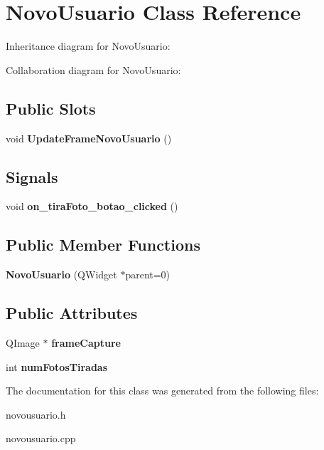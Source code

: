 \hypertarget{classNovoUsuario}{}\section{Novo\+Usuario Class Reference}
\label{classNovoUsuario}


Inheritance diagram for Novo\+Usuario\+:


Collaboration diagram for Novo\+Usuario\+:
\subsection*{Public Slots}
\begin{DoxyCompactItemize}
\item 
void {\bfseries Update\+Frame\+Novo\+Usuario} ()\hypertarget{classNovoUsuario_a023fce202af8022f8fd4a524b86ac3ff}{}\label{classNovoUsuario_a023fce202af8022f8fd4a524b86ac3ff}

\end{DoxyCompactItemize}
\subsection*{Signals}
\begin{DoxyCompactItemize}
\item 
void {\bfseries on\+\_\+tira\+Foto\+\_\+botao\+\_\+clicked} ()\hypertarget{classNovoUsuario_af0e0ed778c6655dffcc5507e780610c1}{}\label{classNovoUsuario_af0e0ed778c6655dffcc5507e780610c1}

\end{DoxyCompactItemize}
\subsection*{Public Member Functions}
\begin{DoxyCompactItemize}
\item 
{\bfseries Novo\+Usuario} (Q\+Widget $\ast$parent=0)\hypertarget{classNovoUsuario_ac8ded8695960d2308b9fe1ae8919a8e3}{}\label{classNovoUsuario_ac8ded8695960d2308b9fe1ae8919a8e3}

\end{DoxyCompactItemize}
\subsection*{Public Attributes}
\begin{DoxyCompactItemize}
\item 
Q\+Image $\ast$ {\bfseries frame\+Capture}\hypertarget{classNovoUsuario_aa235edcc12dedb18b600c5ad23972d6c}{}\label{classNovoUsuario_aa235edcc12dedb18b600c5ad23972d6c}

\item 
int {\bfseries num\+Fotos\+Tiradas}\hypertarget{classNovoUsuario_ad40ab4a4114606baee0f8ba9ea634070}{}\label{classNovoUsuario_ad40ab4a4114606baee0f8ba9ea634070}

\end{DoxyCompactItemize}


The documentation for this class was generated from the following files\+:\begin{DoxyCompactItemize}
\item 
novousuario.\+h\item 
novousuario.\+cpp\end{DoxyCompactItemize}
